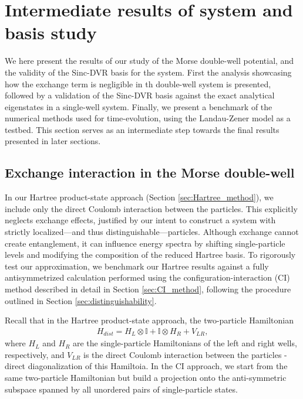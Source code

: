 \documentclass{subfiles}
\begin{document}
\section{Intermediate results of system and basis study}\label{sec:general_study_results}
We here present the results of our study of the Morse double-well potential, and the validity of the Sinc-DVR basis for the system. First the analysis showcasing how the exchange term is negligible in th double-well system is presented, followed by a validation of the Sinc-DVR basis against the exact analytical eigenstates in a single-well system. Finally, we present a benchmark of the numerical methods used for time-evolution, using the Landau-Zener model as a testbed. This section serves as an intermediate step towards the final results presented in later sections.

\subsection{Exchange interaction in the Morse double-well}\label{sec:exchange_interaction}
In our Hartree product-state approach (Section \ref{sec:Hartree_method}), we include only the direct Coulomb interaction between the particles. This explicitly neglects exchange effects, justified by our intent to construct a system with strictly localized—and thus distinguishable—particles. Although exchange cannot create entanglement, it can influence energy spectra by shifting single-particle levels and modifying the composition of the reduced Hartree basis. To rigorously test our approximation, we benchmark our Hartree results against a fully antisymmetrized calculation performed using the configuration-interaction (CI) method described in detail in Section \ref{sec:CI_method}, following the procedure outlined in Section \ref{sec:distinguishability}.

Recall that in the Hartree product-state approach, the two-particle Hamiltonian
\begin{align*}
    H_{dist} = H_L \otimes \mathbb{I} + \mathbb{I} \otimes H_R + V_{LR},
\end{align*}
where $H_L$ and $H_R$ are the single-particle Hamiltonians of the left and right wells, respectively, and $V_{LR}$ is the direct Coulomb interaction between the particles - direct diagonalization of this Hamiltoia. In the CI approach, we start from the same two-particle Hamiltonian but build a projection onto the anti-symmetric subspace spanned by all unordered pairs of single-particle states. 
\end{document}

